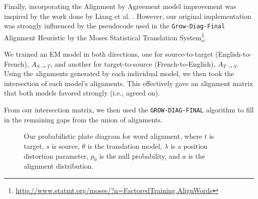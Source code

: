 \documentclass[twoside,twocolumn]{article}
\begin{document}
Finally, incorporating the Alignment by Agreement model improvement was
inspired by the work done by Liang et al. \cite{liang2006alignment}. However,
our original implementation was strongly influenced by the pseudocode used in
the \texttt{Grow-Diag-Final} Alignment Heuristic by the Moses Statistical
Translation
System\footnote{\url{http://www.statmt.org/moses/?n=FactoredTraining.AlignWords}}.

We trained an EM model in both directions, one for source-to-target
(English-to-French), $A_{S \rightarrow T}$, and another for target-to-source
(French-to-English), $A_{T \rightarrow S}$.
Using the alignments generated by each individual model, we then took the intersection of each model's alignments. This effectively gave an alignment
matrix that both models favored strongly (i.e., agreed on). 


From our intersection matrix, we then used the \texttt{GROW-DIAG-FINAL}
algorithm to fill in the remaining gaps from the union of alignments.

\begin{figure}
\centering
{}
\caption{Our probabilistic plate diagram for word alignment, where $t$ is
target, $s$ is source, $\theta$ is the translation model, $\lambda$ is a
position distortion parameter, $p_0$ is the null probability, and $a$ is the
alignment distribution.}
\end{figure}
\end{document}
